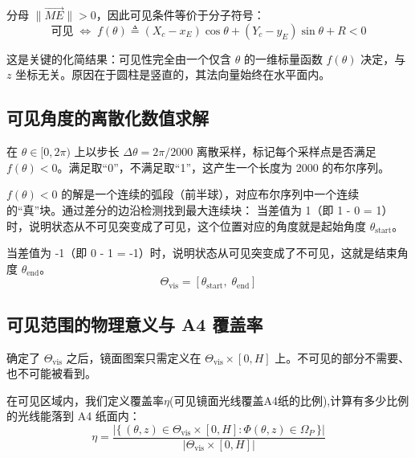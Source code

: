 \documentclass[12pt,a4paper]{ctexart}
\begin{document}
分母 $\|\overrightarrow{ME}\|>0$，因此可见条件等价于分子符号：
\begin{equation}\label{eq:f_theta}
    \text{可见} \;\Longleftrightarrow\; f(\theta) \triangleq (X_c-x_E)\cos\theta + (Y_c-y_E)\sin\theta + R < 0
\end{equation}

这是关键的化简结果：可见性完全由一个仅含 $\theta$ 的一维标量函数 $f(\theta)$ 决定，与 $z$ 坐标无关。原因在于圆柱是竖直的，其法向量始终在水平面内。

\subsection{可见角度的离散化数值求解}

在 $\theta\in[0,2\pi)$ 上以步长 $\Delta\theta = 2\pi/2000$ 离散采样，标记每个采样点是否满足 $f(\theta)<0$。满足取“0”，不满足取“1”，这产生一个长度为 2000 的布尔序列。

$f(\theta)<0$ 的解是一个连续的弧段（前半球），对应布尔序列中一个连续的``真''块。通过差分的边沿检测找到最大连续块：
当差值为 1（即 1 - 0 = 1）时，说明状态从不可见突变成了可见，这个位置对应的角度就是起始角度 $\theta_{\mathrm{start}}$。

当差值为 -1（即 0 - 1 = -1）时，说明状态从可见突变成了不可见，这就是结束角度 $\theta_{\mathrm{end}}$。
\begin{equation}
    \Theta_{\mathrm{vis}} = [\theta_{\mathrm{start}},\; \theta_{\mathrm{end}}]
\end{equation}

\medskip

\subsection{可见范围的物理意义与 A4 覆盖率}

确定了 $\Theta_{\mathrm{vis}}$ 之后，镜面图案只需定义在 $\Theta_{\mathrm{vis}}\times[0,H]$ 上。不可见的部分不需要、也不可能被看到。

在可见区域内，我们定义覆盖率$\eta$(可见镜面光线覆盖A4纸的比例),计算有多少比例的光线能落到 A4 纸面内：
\begin{equation}
    \eta = \frac{\bigl|\{\,(\theta,z)\in\Theta_{\mathrm{vis}}\times[0,H] : \Phi(\theta,z)\in\Omega_P\,\}\bigr|}
                 {\bigl|\Theta_{\mathrm{vis}}\times[0,H]\bigr|}
\end{equation}
\end{document}

